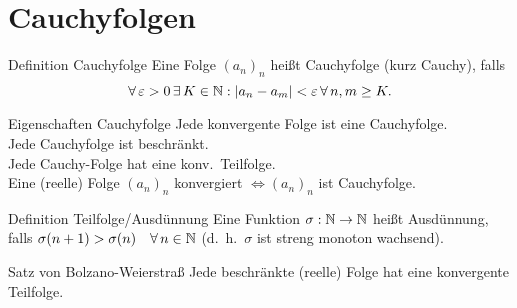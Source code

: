 \documentclass[main.tex]{subfiles}
\begin{document}
\section*{Cauchyfolgen}

\begin{karte}{Definition Cauchyfolge}
    Eine Folge \({(a_n)}_n\) heißt Cauchyfolge (kurz Cauchy), falls
    \[ \forall \varepsilon > 0 \,\exists K\in\N: 
    \abs{a_n-a_m} < \varepsilon \, \forall n,m\geq K. \]
\end{karte}
\begin{karte}{Eigenschaften Cauchyfolge}
    Jede konvergente Folge ist eine Cauchyfolge.\\
    Jede Cauchyfolge ist beschränkt.\\
    Jede Cauchy-Folge hat eine konv.\ Teilfolge.\\
    Eine (reelle) Folge \({(a_n)}_n\) konvergiert 
    \( \Leftrightarrow {(a_n)}_n \) ist Cauchyfolge.
\end{karte}
\begin{karte}{Definition Teilfolge/Ausdünnung}
    Eine Funktion \( \sigma:\mathbb{N} \rightarrow\mathbb{N} \) 
    heißt Ausdünnung, falls \( \sigma (n+1) 
    > \sigma(n) \quad \forall n\in\N \) 
    (d.\ h.\  \(\sigma \) ist streng monoton wachsend).
\end{karte}
\begin{karte}{Satz von Bolzano-Weierstraß}
    Jede beschränkte (reelle) Folge hat eine konvergente Teilfolge.
\end{karte}
\end{document}
